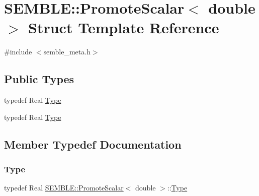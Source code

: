 \hypertarget{structSEMBLE_1_1PromoteScalar_3_01double_01_4}{}\section{S\+E\+M\+B\+LE\+:\+:Promote\+Scalar$<$ double $>$ Struct Template Reference}
\label{structSEMBLE_1_1PromoteScalar_3_01double_01_4}


{\ttfamily \#include $<$semble\+\_\+meta.\+h$>$}

\subsection*{Public Types}
\begin{DoxyCompactItemize}
\item 
typedef Real \mbox{\hyperlink{structSEMBLE_1_1PromoteScalar_3_01double_01_4_adf38a6733a66eb206758760f6481a791}{Type}}
\item 
typedef Real \mbox{\hyperlink{structSEMBLE_1_1PromoteScalar_3_01double_01_4_adf38a6733a66eb206758760f6481a791}{Type}}
\end{DoxyCompactItemize}


\subsection{Member Typedef Documentation}
\mbox{\label{structSEMBLE_1_1PromoteScalar_3_01double_01_4_adf38a6733a66eb206758760f6481a791}} 
\subsubsection{\texorpdfstring{Type}{Type}\hspace{0.1cm}{\footnotesize\ttfamily [1/2]}}
{\footnotesize\ttfamily typedef Real \mbox{\hyperlink{structSEMBLE_1_1PromoteScalar}{S\+E\+M\+B\+L\+E\+::\+Promote\+Scalar}}$<$ double $>$\+::\mbox{\hyperlink{structSEMBLE_1_1PromoteScalar_3_01double_01_4_adf38a6733a66eb206758760f6481a791}{Type}}}

\mbox{\label{structSEMBLE_1_1PromoteScalar_3_01double_01_4_adf38a6733a66eb206758760f6481a791}} 

